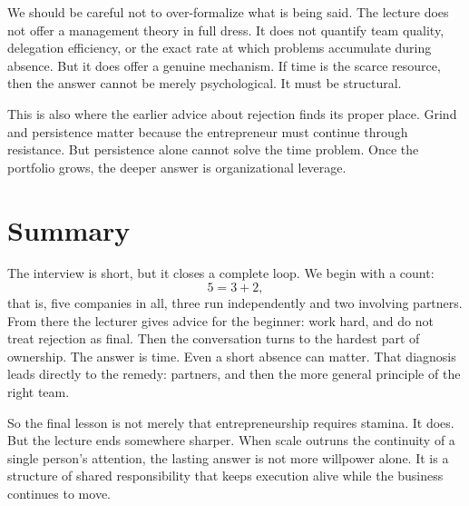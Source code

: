 We should be careful not to over-formalize what is being said. The lecture does not offer a management theory in full dress. It does not quantify team quality, delegation efficiency, or the exact rate at which problems accumulate during absence. But it does offer a genuine mechanism. If time is the scarce resource, then the answer cannot be merely psychological. It must be structural.

This is also where the earlier advice about rejection finds its proper place. Grind and persistence matter because the entrepreneur must continue through resistance. But persistence alone cannot solve the time problem. Once the portfolio grows, the deeper answer is organizational leverage.

\section{Summary}

The interview is short, but it closes a complete loop. We begin with a count:
\begin{equation}
5 = 3 + 2,
\end{equation}
that is, five companies in all, three run independently and two involving partners. From there the lecturer gives advice for the beginner: work hard, and do not treat rejection as final. Then the conversation turns to the hardest part of ownership. The answer is time. Even a short absence can matter. That diagnosis leads directly to the remedy: partners, and then the more general principle of the right team.

So the final lesson is not merely that entrepreneurship requires stamina. It does. But the lecture ends somewhere sharper. When scale outruns the continuity of a single person's attention, the lasting answer is not more willpower alone. It is a structure of shared responsibility that keeps execution alive while the business continues to move.